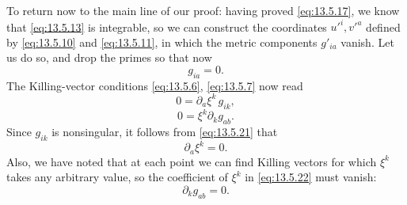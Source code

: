 To return now to the main line of our proof: having proved
\eqref{eq:13.5.17}, we know that \eqref{eq:13.5.13} is integrable, so we
can construct the coordinates \(u'^i,v'^a\) defined by
\eqref{eq:13.5.10} and \eqref{eq:13.5.11}, in which the metric components
\(g'_{ia}\) vanish. Let us do so, and drop the primes so that now
\begin{equation}
  g_{ia}=0.
  \tag{13.5.20}\label{eq:13.5.20}
\end{equation}
The Killing-vector conditions \eqref{eq:13.5.6}, \eqref{eq:13.5.7} now
read
\begin{equation}
  0=\partial_a\xi^k\,g_{ik},
  \tag{13.5.21}\label{eq:13.5.21}
\end{equation}
\begin{equation}
  0=\xi^k\partial_k g_{ab}.
  \tag{13.5.22}\label{eq:13.5.22}
\end{equation}
Since \(g_{ik}\) is nonsingular, it follows from \eqref{eq:13.5.21} that
\begin{equation}
  \partial_a\xi^k=0.
  \tag{13.5.23}\label{eq:13.5.23}
\end{equation}
Also, we have noted that at each point we can find Killing vectors for which
\(\xi^k\) takes any arbitrary value, so the coefficient of \(\xi^k\) in
\eqref{eq:13.5.22} must vanish:
\begin{equation}
  \partial_k g_{ab}=0.
  \tag{13.5.24}\label{eq:13.5.24}
\end{equation}

